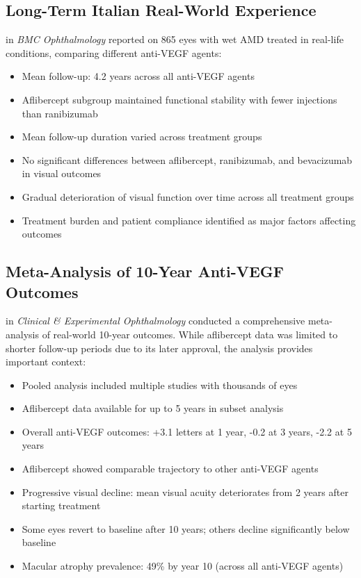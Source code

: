 \subsection{Long-Term Italian Real-World Experience}

\citet{verittiLongTermOutcomesIntravitreal2021} in \textit{BMC Ophthalmology} reported on 865 eyes with wet AMD treated in real-life conditions, comparing different anti-VEGF agents:

\begin{itemize}
    \item Mean follow-up: 4.2 years across all anti-VEGF agents
    \item Aflibercept subgroup maintained functional stability with fewer injections than ranibizumab
    \item Mean follow-up duration varied across treatment groups
    \item No significant differences between aflibercept, ranibizumab, and bevacizumab in visual outcomes
    \item Gradual deterioration of visual function over time across all treatment groups
    \item Treatment burden and patient compliance identified as major factors affecting outcomes
\end{itemize}

\subsection{Meta-Analysis of 10-Year Anti-VEGF Outcomes}

\citet{spoonerRealWorld10YearOutcomes2025} in \textit{Clinical \& Experimental Ophthalmology} conducted a comprehensive meta-analysis of real-world 10-year outcomes. While aflibercept data was limited to shorter follow-up periods due to its later approval, the analysis provides important context:

\begin{itemize}
    \item Pooled analysis included multiple studies with thousands of eyes
    \item Aflibercept data available for up to 5 years in subset analysis
    \item Overall anti-VEGF outcomes: +3.1 letters at 1 year, -0.2 at 3 years, -2.2 at 5 years
    \item Aflibercept showed comparable trajectory to other anti-VEGF agents
    \item Progressive visual decline: mean visual acuity deteriorates from 2 years after starting treatment
    \item Some eyes revert to baseline after 10 years; others decline significantly below baseline
    \item Macular atrophy prevalence: 49\% by year 10 (across all anti-VEGF agents)
\end{itemize}

